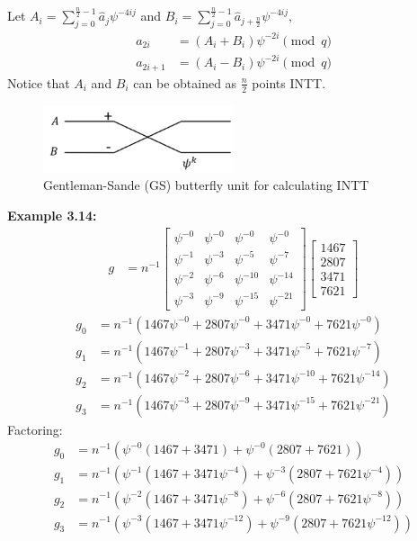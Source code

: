\documentclass[12pt]{report}
\begin{document}
Let $A_{i}=\sum_{j=0}^{\frac{n}{2}-1}\hat{a}_{j}\psi^{-4ij}$ and $B_{i}=\sum_{j=0}^{\frac{n}{2}-1}\hat{a}_{j+\frac{n}{2}}\psi^{-4ij},$
\begin{align*}
a_{2i} &= (A_i + B_i)\psi^{-2i} \pmod{q} \\
a_{2i+1} &= (A_i - B_i)\psi^{-2i} \pmod{q}
\end{align*}
Notice that $A_i$ and $B_i$ can be obtained as $\frac{n}{2}$ points INTT.
\begin{figure}[H]
    \centering
    \includegraphics[width=0.5\textwidth]{./ntt_figures/6.png}
    \caption{Gentleman-Sande (GS) butterfly unit for calculating INTT}
\end{figure}
\textbf{Example 3.14:}
\begin{align*}
    g &= n^{-1} \begin{bmatrix}
    \psi^{-0} & \psi^{-0} & \psi^{-0} & \psi^{-0} \\
    \psi^{-1} & \psi^{-3} & \psi^{-5} & \psi^{-7} \\
    \psi^{-2} & \psi^{-6} & \psi^{-10} & \psi^{-14} \\
    \psi^{-3} & \psi^{-9} & \psi^{-15} & \psi^{-21}
    \end{bmatrix}
    \begin{bmatrix}
    1467 \\ 2807 \\ 3471 \\ 7621
    \end{bmatrix}
\end{align*}
\begin{align*}
    g_0 &= n^{-1}(1467\psi^{-0} + 2807\psi^{-0} + 3471\psi^{-0} + 7621\psi^{-0}) \\
    g_1 &= n^{-1}(1467\psi^{-1} + 2807\psi^{-3} + 3471\psi^{-5} + 7621\psi^{-7}) \\
    g_2 &= n^{-1}(1467\psi^{-2} + 2807\psi^{-6} + 3471\psi^{-10} + 7621\psi^{-14}) \\
    g_3 &= n^{-1}(1467\psi^{-3} + 2807\psi^{-9} + 3471\psi^{-15} + 7621\psi^{-21})
\end{align*}
Factoring:
\begin{align*}
    g_0 &= n^{-1}(\psi^{-0}(1467 + 3471) + \psi^{-0}(2807 + 7621)) \\
    g_1 &= n^{-1}(\psi^{-1}(1467 + 3471\psi^{-4}) + \psi^{-3}(2807 + 7621\psi^{-4})) \\
    g_2 &= n^{-1}(\psi^{-2}(1467 + 3471\psi^{-8}) + \psi^{-6}(2807 + 7621\psi^{-8})) \\
    g_3 &= n^{-1}(\psi^{-3}(1467 + 3471\psi^{-12}) + \psi^{-9}(2807 + 7621\psi^{-12}))
\end{align*}
\end{document}
